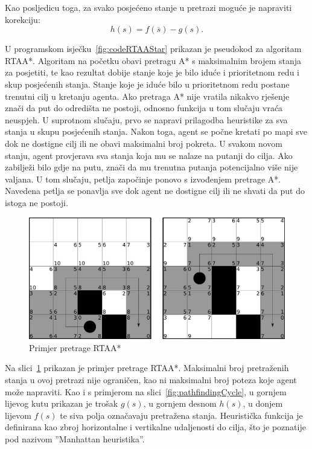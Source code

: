\documentclass[times, utf8, zavrsni, numeric]{fer}
\begin{document}
\par Kao posljedicu toga, za svako posjećeno stanje u pretrazi moguće je napraviti korekciju:
\begin{equation}
h(s) = f(\overline{s}) - g(s).
\end{equation}

\begin{minipage}{\textwidth}
	
\end{minipage}

U programskom isječku~\ref{fig:codeRTAAStar} prikazan je pseudokod za algoritam RTAA*. 
Algoritam na početku obavi pretragu A* s maksimalnim brojem stanja za posjetiti, te kao rezultat dobije stanje koje je bilo iduće i prioritetnom redu i skup posjećenih stanja.
Stanje koje je iduće bilo u prioritetnom redu postane trenutni cilj u kretanju agenta.
Ako pretraga A* nije vratila nikakvo rješenje znači da put do odredišta ne postoji, odnosno funkcija u tom slučaju vraća neuspjeh.
U suprotnom slučaju, prvo se napravi prilagodba heuristike za sva stanja u skupu posjećenih stanja.
Nakon toga, agent se počne kretati po mapi sve dok ne dostigne cilj ili ne obavi maksimalni broj pokreta.
U svakom novom stanju, agent provjerava sva stanja koja mu se nalaze na putanji do cilja.
Ako zabilježi bilo gdje na putu, znači da mu trenutna putanja potencijalno više nije valjana. 
U tom slučaju, petlja započinje ponovo s izvođenjem pretrage A*.
Navedena petlja se ponavlja sve dok agent ne dostigne cilj ili ne shvati da put do istoga ne postoji.

\begin{figure}[h]
	\centering
	\includegraphics[width=0.9\linewidth]{images/rtaastar.pdf}
	\caption{Primjer pretrage RTAA*\cite{article:RTAAStar}}
	\label{fig:rtaastar}
\end{figure}

\par Na slici~\ref{fig:rtaastar} prikazan je primjer pretrage RTAA*.
Maksimalni broj pretraženih stanja u ovoj pretrazi nije ograničen, kao ni maksimalni broj poteza koje agent može napraviti.
Kao i s primjerom na slici~\ref{fig:pathfindingCycle}, u gornjem lijevog kutu prikazan je trošak \(g(s)\), u gornjem desnom \(h(s)\), u donjem lijevom \(f(s)\) te siva polja označavaju pretražena stanja.
Heuristička funkcija je definirana kao zbroj horizontalne i vertikalne udaljenosti do cilja, što je poznatije pod nazivom ''Manhattan heuristika''.
\end{document}
